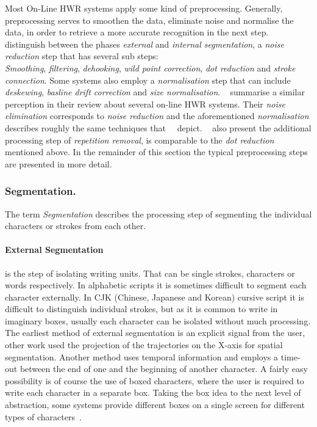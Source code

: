 Most On-Line HWR systems apply some kind of preprocessing. Generally, 
preprocessing serves to smoothen the data, eliminate noise and normalise the
data, in order to retrieve a more accurate recognition in the next step.
~\citeyear{Tappert1990} distinguish between the phases \emph{external} and 
\emph{internal segmentation}, a \emph{noise reduction} step that has several 
sub steps:\\
\emph{Smoothing}, \emph{filtering}, \emph{dehooking},
\emph{wild point correction}, \emph{dot reduction} and \emph{stroke connection}.
Some systems also employ a \emph{normalisation} step that can include
\emph{deskewing}, \emph{basline drift correction} and \emph{size normalisation}.
~\citeyear{Santosh2009} summarise a similar perception in their review about several
on-line HWR systems. Their \emph{noise elimination} corresponds to 
\emph{noise reduction} and the aforementioned \emph{normalisation} describes 
roughly the same techniques that~~\citeyear{Tappert1990} depict.
~\citeyear{Santosh2009} also present the additional processing step of 
\emph{repetition removal}, is comparable to the \emph{dot reduction} mentioned 
above. In the remainder of this section the typical preprocessing steps are 
presented in more detail.

\subsubsection{Segmentation.}
\label{sec:segmentation}

The term \emph{Segmentation} describes the processing step of segmenting the 
individual characters or strokes from each other.

\paragraph{External Segmentation}
\label{sec:externasegmentation}
is the step of isolating writing units. That can be
single strokes, characters or words respectively. In alphabetic scripts it is 
sometimes difficult to segment each character externally. In CJK (Chinese, 
Japanese and Korean) cursive script it is difficult to distinguish individual 
strokes, but as it is common to write in imaginary boxes, usually each character 
can be isolated without much processing.
The earliest method of external segmentation is an explicit signal from the user,
other work used the projection of the trajectories on the X-axis for spatial
segmentation. Another method uses temporal information and employs a time-out
between the end of one and the beginning of another character.
A fairly easy possibility is of course the use of boxed characters, where the 
user is required to write each character in a separate box.
Taking the box idea to the next level of abstraction, some systems provide 
different boxes on a single screen for different types of 
characters~.

